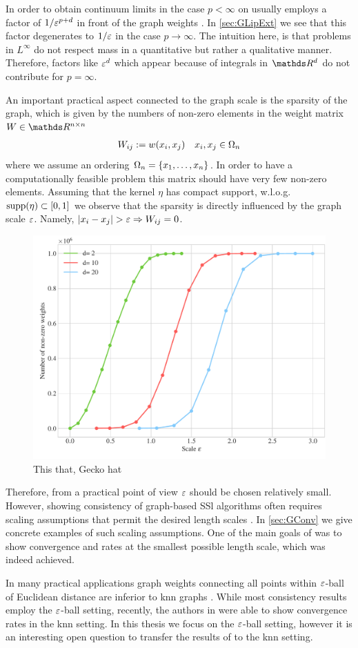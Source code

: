 %
%
\begin{remark}{}{}
In order to obtain continuum limits in the case $p<\infty$ on usually employs a factor of $1/\varepsilon^{p+d}$ in front of the graph weights \cite{GarcSlep15, slepcev2019analysis}. In \cref{sec:GLipExt} we see that this factor degenerates to $1/\varepsilon$ in the case $p\to\infty$. The intuition here, is that problems in $L^\infty$ do not respect mass in a quantitative but rather a qualitative manner. Therefore, factors like $\varepsilon^d$ which appear because of integrals in $\R^d$ do not contribute for $p=\infty$.
\end{remark}
%
%
An important practical aspect connected to the graph scale is the sparsity of the graph, which is given by the numbers of non-zero elements in the weight matrix $W\in\R^{n\times n}$
%
\begin{align*}
W_{ij}:= w(x_i,x_j) \quad x_i,x_j\in\Omega_n
\end{align*}
%
where we assume an ordering $\Omega_n=\{x_1,\ldots, x_n\}$. In order to have a computationally feasible problem this matrix should have very few non-zero elements. Assuming that the kernel $\eta$ has compact support, w.l.o.g. $\mathrm{supp}(\eta)\subset [0,1]$ we observe that the sparsity is directly influenced by the graph scale $\varepsilon$. Namely, $\left|x_i-x_j\right| > \varepsilon \Rightarrow W_{ij}=0$.
%
%
\begin{figure}
\centering
\includegraphics[width=.5\textwidth]{code/SSL/NNZ.pdf}
\caption{This that, Gecko hat}
\end{figure} 
%
%
Therefore, from a practical point of view $\varepsilon$ should be chosen relatively small. However, showing consistency of graph-based SSl algorithms often requires scaling assumptions that permit the desired length scales \cite{GarcSlep15, slepcev2019analysis, calder2019consistency}. In \cref{sec:GConv} we give concrete examples of such scaling assumptions. One of the main goals of \cite{roith2022continuum, bungert2021uniform} was to show convergence and rates at the smallest possible length scale, which was indeed achieved.
%
%
%
\begin{remark}{}{}
In many practical applications graph weights connecting all points within $\varepsilon$-ball of Euclidean distance are inferior to knn graphs \cite{calder2020poisson, flores2019algorithms, calder2022improved}. While most consistency results employ the $\varepsilon$-ball setting, recently, the authors in \cite{calder2022improved} were able to show convergence rates in the knn setting. In this thesis we focus on the $\varepsilon$-ball setting, however it is an interesting open question to transfer the results of \cite{roith2022continuum, bungert2021uniform, bungert2022ratio} to the knn setting.
\end{remark}
%
%
